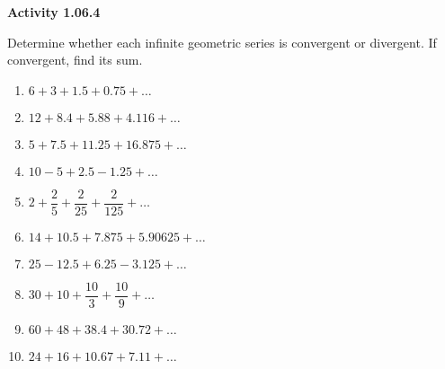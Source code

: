 \vspace{0.3ex}
\noindent\textbf{Activity 1.06.4}

\vspace{0.2ex}

Determine whether each infinite geometric series is convergent or divergent. If convergent, find its sum.
\begin{multicols}{2}
\begin{enumerate}
    \item \( 6 + 3 + 1.5 + 0.75 + \dots \)
    \item \( 12 + 8.4 + 5.88 + 4.116 + \dots \)
    \item \( 5 + 7.5 + 11.25 + 16.875 + \dots \)
    \item \( 10 - 5 + 2.5 - 1.25 + \dots \)
    \item \( 2 + \dfrac{2}{5} + \dfrac{2}{25} + \dfrac{2}{125} + \dots \)
    \item \( 14 + 10.5 + 7.875 + 5.90625 + \dots \)
    \item \( 25 - 12.5 + 6.25 - 3.125 + \dots \)
    \item \( 30 + 10 + \dfrac{10}{3} + \dfrac{10}{9} + \dots \)
    \item \( 60 + 48 + 38.4 + 30.72 + \dots \)
    \item \( 24 + 16 + 10.67 + 7.11 + \dots \)
\end{enumerate}
\end{multicols}
